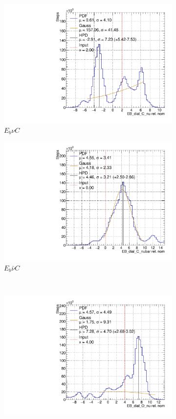 \begin{figure}[t]
\centering
\begin{subfigure}{.48\textwidth}
  \centering
  \includegraphics[width=0.73\linewidth]{figs/EB_dial_C_nuData}
  \caption{$E_{b}\nu C$}
\end{subfigure}
\begin{subfigure}{.48\textwidth}
  \centering
  \includegraphics[width=0.73\linewidth]{figs/EB_dial_C_nubarData}
  \caption{$E_{b}\bar{\nu}C$}
\end{subfigure} \\
\begin{subfigure}{.48\textwidth}
  \centering
  \includegraphics[width=0.73\linewidth]{figs/EB_dial_O_nuData}

\end{subfigure}
\end{figure}
